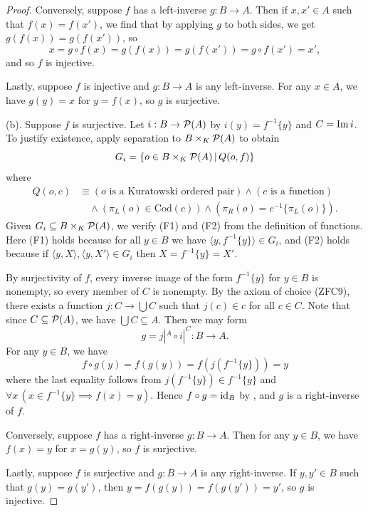 \begin{proof}
	Conversely, suppose $f$ has a left-inverse $g:B\rightarrow A$. 
	Then if $x, x'\in A$ such that $f(x) = f(x')$, we find that by applying $g$ to both sides, we get $g(f(x)) = g(f(x'))$, so
	\[ x = g\circ f(x) = g(f(x)) = g(f(x')) = g\circ f(x') = x', \]
	and so $f$ is injective. 
	
	Lastly, suppose $f$ is injective and $g:B\rightarrow A$ is any left-inverse. 
	For any $x\in A$, we have $g(y) = x$ for $y = f(x)$, so $g$ is surjective. 
	
	(b).
	Suppose $f$ is surjective. 
	Let $i:B\rightarrow\mathcal{P}(A)$ by $i(y) = f^{-1}\{y\}$ and $C = \operatorname{Im} i$. 
	To justify existence, apply separation to $B\times_{K}\mathcal{P}(A)$ to obtain
	\[ G_{i} = \{ o\in B\times_{K}\mathcal{P}(A) \,|\, Q(o, f) \} \]
	where
	\begin{align*}
		Q(o, c) &\equiv (o\text{ is a Kuratowski ordered pair})\land (c\text{ is a function}) \\
		&\quad\land (\pi_{L}(o)\in\textrm{Cod}(c))\land (\pi_{R}(o) = c^{-1}\{\pi_{L}(o)\}).
	\end{align*}
	Given $G_{i}\subseteq B\times_{K}\mathcal{P}(A)$, we verify (F1) and (F2) from the definition of functions.
	Here (F1) holds because for all $y\in B$ we have $\langle y, f^{-1}\{y\}\rangle\in G_{i}$, and (F2) holds because if $\langle y, X\rangle, \langle y, X'\rangle\in G_{i}$ then $X = f^{-1}\{y\} = X'$.
	
	By surjectivity of $f$, every inverse image of the form $f^{-1}\{y\}$ for $y\in B$ is nonempty, so every member of $C$ is nonempty.
	By the axiom of choice (ZFC9), there exists a function $j:C\rightarrow\bigcup C$ such that $j(c)\in c$ for all $c\in C$. 
	Note that since $C\subseteq\mathcal{P}(A)$, we have $\bigcup C\subseteq A$. 
	Then we may form 
	\[ g = j|^{A}\circ i|^{C}:B\rightarrow A. \] 
	For any $y\in B$, we have
	\[ f\circ g(y) = f(g(y)) = f(j(f^{-1}\{y\})) = y \]
	where the last equality follows from $j(f^{-1}\{y\})\in f^{-1}\{y\}$ and $\forall x\, (x\in f^{-1}\{y\}\implies f(x) = y)$. 
	Hence $f\circ g = \operatorname{id}_{B}$ by , and $g$ is a right-inverse of $f$.
	
	Conversely, suppose $f$ has a right-inverse $g:B\rightarrow A$. 
	Then for any $y\in B$, we have $f(x) = y$ for $x = g(y)$, so $f$ is surjective.
	
	Lastly, suppose $f$ is surjective and $g:B\rightarrow A$ is any right-inverse. 
	If $y, y'\in B$ such that $g(y) = g(y')$, then $y = f(g(y)) = f(g(y')) = y'$, so $g$ is injective. 
	

\end{proof}
